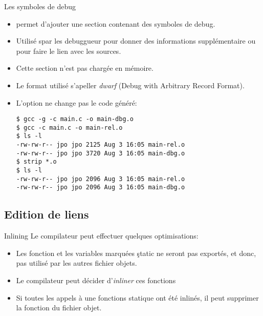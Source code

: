 \begin{frame}[fragile=singleslide]{Les symboles de debug}
  \begin{itemize}
  \item {} permet d'ajouter  une section contenant des symboles de
    debug.
  \item  Utilisé  spar les  debuggueur  pour  donner des  informations
    supplémentaire ou pour faire le lien avec les sources.
  \item Cette section n'est pas chargée en mémoire.
  \item Le format utilisé s'apeller \emph{dwarf} (Debug with Arbitrary
    Record Format).
  \item L'option  ne change pas le code généré:
    \begin{lstlisting}
$ gcc -g -c main.c -o main-dbg.o
$ gcc -c main.c -o main-rel.o
$ ls -l
-rw-rw-r-- jpo jpo 2125 Aug 3 16:05 main-rel.o
-rw-rw-r-- jpo jpo 3720 Aug 3 16:05 main-dbg.o
$ strip *.o
$ ls -l
-rw-rw-r-- jpo jpo 2096 Aug 3 16:05 main-rel.o
-rw-rw-r-- jpo jpo 2096 Aug 3 16:05 main-dbg.o
    \end{lstlisting}
  \end{itemize}
\end{frame}

\subsection{Edition de liens}

\begin{frame}[fragile=singleslide]{Inlining}
  Le compilateur peut effectuer quelques optimisations:
  \begin{itemize}
  \item Les  fonction et les  variables marquées \c{static}  ne seront
    pas exportés, et donc, pas utilisé par les autres fichier objets.
  \item  Le compilateur peut décider d'\emph{inliner} ces fonctions
  \item Si toutes les appels à une fonctions statique ont été inlinés,
    il peut supprimer la fonction du fichier objet.
  \end{itemize}
\end{frame}

